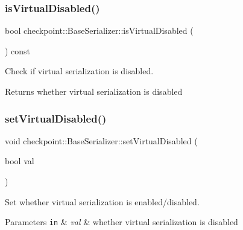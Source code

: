 \subsubsection{\texorpdfstring{is\+Virtual\+Disabled()}{isVirtualDisabled()}}
{\footnotesize\ttfamily bool checkpoint\+::\+Base\+Serializer\+::is\+Virtual\+Disabled (\begin{DoxyParamCaption}{ }\end{DoxyParamCaption}) const\hspace{0.3cm}{\ttfamily [inline]}}



Check if virtual serialization is disabled. 

\begin{DoxyReturn}{Returns}
whether virtual serialization is disabled 
\end{DoxyReturn}
\mbox{\label{structcheckpoint_1_1_base_serializer_ab16e2ffa62f03f8410b116c637bd4adc}} 
\subsubsection{\texorpdfstring{set\+Virtual\+Disabled()}{setVirtualDisabled()}}
{\footnotesize\ttfamily void checkpoint\+::\+Base\+Serializer\+::set\+Virtual\+Disabled (\begin{DoxyParamCaption}\item[{bool}]{val }\end{DoxyParamCaption})\hspace{0.3cm}{\ttfamily [inline]}}



Set whether virtual serialization is enabled/disabled. 


\begin{DoxyParams}[1]{Parameters}
\mbox{\tt in}  & {\em val} & whether virtual serialization is disabled \\
\hline
\end{DoxyParams}
\mbox{\label{structcheckpoint_1_1_base_serializer_a7e3575fbbd4bf5bc39d8efb67c014e07}} 
